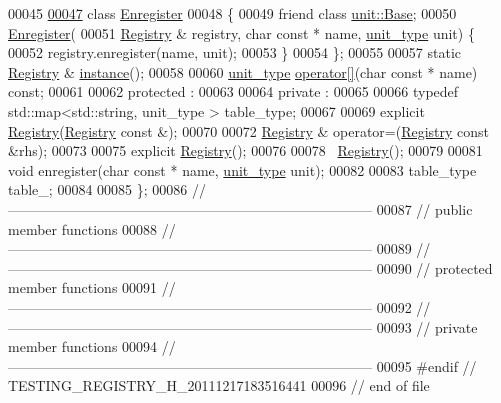 \begin{DoxyCode}
00045 
\hypertarget{testing__registry_8h_source_l00047}{}\hyperlink{classhryky_1_1testing_1_1_registry_1_1_enregister}{00047}     \textcolor{keyword}{class }\hyperlink{classhryky_1_1testing_1_1_registry_1_1_enregister}{Enregister}
00048     \{
00049         \textcolor{keyword}{friend} \textcolor{keyword}{class }\hyperlink{classhryky_1_1testing_1_1unit_1_1_base}{unit::Base};
00050         \hyperlink{classhryky_1_1testing_1_1_registry_1_1_enregister}{Enregister}(
00051             \hyperlink{classhryky_1_1testing_1_1_registry}{Registry} & registry, \textcolor{keywordtype}{char} \textcolor{keyword}{const} * name, \hyperlink{classhryky_1_1testing_1_1unit_1_1_base}{unit_type} unit) \{
00052             registry.enregister(name, unit);
00053         \}
00054     \};
00055 
00057     \textcolor{keyword}{static} \hyperlink{classhryky_1_1testing_1_1_registry}{Registry} & \hyperlink{classhryky_1_1testing_1_1_registry_adf6d2875f479e3b523a0ceab5434319f}{instance}();
00058 
00060     \hyperlink{classhryky_1_1testing_1_1unit_1_1_base}{unit_type} \hyperlink{classhryky_1_1testing_1_1_registry_aeed75a668cad923da49123e78153cac6}{operator[]}(\textcolor{keywordtype}{char} \textcolor{keyword}{const} * name) \textcolor{keyword}{const};
00061 
00062 \textcolor{keyword}{protected} :
00063 
00064 \textcolor{keyword}{private} :
00065 
00066     \textcolor{keyword}{typedef} std::map<std::string, unit\_type >   table\_type;
00067 
00069     \textcolor{keyword}{explicit} \hyperlink{classhryky_1_1testing_1_1_registry}{Registry}(\hyperlink{classhryky_1_1testing_1_1_registry}{Registry} \textcolor{keyword}{const} &);
00070 
00072     \hyperlink{classhryky_1_1testing_1_1_registry}{Registry} & operator=(\hyperlink{classhryky_1_1testing_1_1_registry}{Registry} \textcolor{keyword}{const} &rhs);
00073 
00075     \textcolor{keyword}{explicit} \hyperlink{classhryky_1_1testing_1_1_registry}{Registry}();
00076 
00078     ~\hyperlink{classhryky_1_1testing_1_1_registry}{Registry}();
00079 
00081     \textcolor{keywordtype}{void} enregister(\textcolor{keywordtype}{char} \textcolor{keyword}{const} * name, \hyperlink{classhryky_1_1testing_1_1unit_1_1_base}{unit_type} unit);
00082 
00083     table\_type table\_;
00084 
00085 \};
00086 \textcolor{comment}{//
      ------------------------------------------------------------------------------}
00087 \textcolor{comment}{// public member functions}
00088 \textcolor{comment}{//
      ------------------------------------------------------------------------------}
00089 \textcolor{comment}{//
      ------------------------------------------------------------------------------}
00090 \textcolor{comment}{// protected member functions}
00091 \textcolor{comment}{//
      ------------------------------------------------------------------------------}
00092 \textcolor{comment}{//
      ------------------------------------------------------------------------------}
00093 \textcolor{comment}{// private member functions}
00094 \textcolor{comment}{//
      ------------------------------------------------------------------------------}
00095 \textcolor{preprocessor}{#endif // TESTING\_REGISTRY\_H\_20111217183516441}
00096 \textcolor{preprocessor}{}\textcolor{comment}{// end of file}
\end{DoxyCode}
